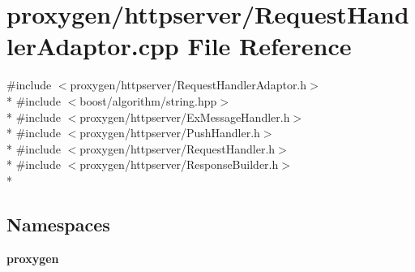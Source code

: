 \section{proxygen/httpserver/\+Request\+Handler\+Adaptor.cpp File Reference}
\label{RequestHandlerAdaptor_8cpp}
{\ttfamily \#include $<$proxygen/httpserver/\+Request\+Handler\+Adaptor.\+h$>$}\\*
{\ttfamily \#include $<$boost/algorithm/string.\+hpp$>$}\\*
{\ttfamily \#include $<$proxygen/httpserver/\+Ex\+Message\+Handler.\+h$>$}\\*
{\ttfamily \#include $<$proxygen/httpserver/\+Push\+Handler.\+h$>$}\\*
{\ttfamily \#include $<$proxygen/httpserver/\+Request\+Handler.\+h$>$}\\*
{\ttfamily \#include $<$proxygen/httpserver/\+Response\+Builder.\+h$>$}\\*
\subsection*{Namespaces}
\begin{DoxyCompactItemize}
\item 
 {\bf proxygen}
\end{DoxyCompactItemize}
